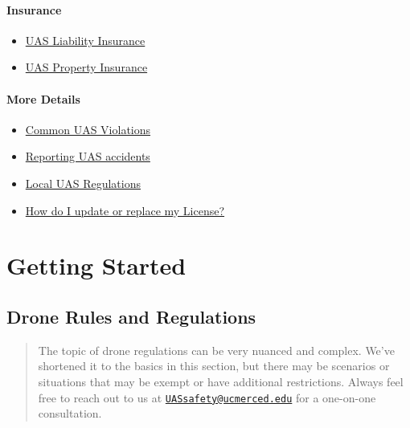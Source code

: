 \documentclass[
]{book}
\providecommand{\tightlist}{%
  \setlength{\itemsep}{0pt}\setlength{\parskip}{0pt}}
\begin{document}
\hypertarget{insurance}{%
\subsection*{Insurance}\label{insurance}}

\begin{itemize}
\tightlist
\item
  \protect\hyperlink{ch-liability-insurance}{UAS Liability Insurance}
\item
  \protect\hyperlink{ch-hull-insurance}{UAS Property Insurance}
\end{itemize}

\hypertarget{more-details}{%
\subsection*{More Details}\label{more-details}}

\begin{itemize}
\tightlist
\item
  \protect\hyperlink{ch-common-UAS-violations}{Common UAS Violations}
\item
  \protect\hyperlink{ch-uas-accident}{Reporting UAS accidents}
\item
  \protect\hyperlink{ch-local-UAS-regulations}{Local UAS Regulations}
\item
  \protect\hyperlink{ch-replace-license}{How do I update or replace my License?}
\end{itemize}

\hypertarget{part-getting-started}{%
\part{Getting Started}\label{part-getting-started}}

\hypertarget{ch-regulations}{%
\chapter{Drone Rules and Regulations}\label{ch-regulations}}

\begin{quote}
The topic of drone regulations can be very nuanced and complex. We've shortened it to the basics in this section, but there may be scenarios or situations that may be exempt or have additional restrictions. Always feel free to reach out to us at \href{mailto:UASsafety@ucmerced.edu}{\nolinkurl{UASsafety@ucmerced.edu}} for a one-on-one consultation.
\end{quote}
\end{document}
